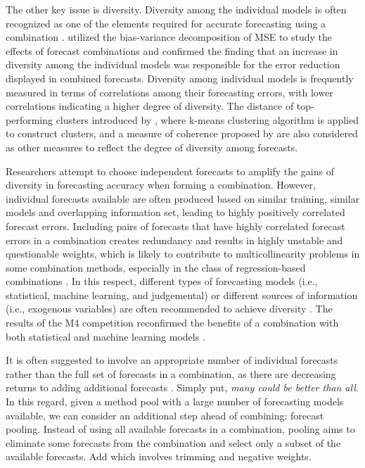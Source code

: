 \documentclass[11pt]{article}
\begin{document}
The other key issue is diversity. Diversity among the individual models is often recognized as one of the elements required for accurate forecasting using a combination \citep{Batchelor1995-ps,Brown2005-aa,Thomson2019-al}. \cite{Atiya2020-ge} utilized the bias-variance decomposition of MSE to study the effects of forecast combinations and confirmed the finding that an increase in diversity among the individual models was responsible for the error reduction displayed in combined forecasts. Diversity among individual models is frequently measured in terms of correlations among their forecasting errors, with lower correlations indicating a higher degree of diversity. The distance of top-performing clusters introduced by \cite{Lemke2010-wn}, where k-means clustering algorithm is applied to construct clusters, and a measure of coherence proposed by \cite{Thomson2019-al} are also considered as other measures to reflect the degree of diversity among forecasts.

Researchers attempt to choose independent forecasts to amplify the gains of diversity in forecasting accuracy when forming a combination. However, individual forecasts available are often produced based on similar training, similar models and overlapping information set, leading to highly positively correlated forecast errors. Including pairs of forecasts that have highly correlated forecast errors in a combination creates redundancy and results in highly unstable and questionable weights, which is likely to contribute to multicollinearity problems in some combination methods, especially in the class of regression-based combinations \citep{Granger1984-jc}. In this respect, different types of forecasting models (i.e., statistical, machine learning, and judgemental) or different sources of information (i.e., exogenous variables) are often recommended to achieve diversity \citep{Atiya2020-ge}. The results of the M4 competition reconfirmed the benefits of a combination with both statistical and machine learning models \citep{Makridakis2020-hu}.

It is often suggested to involve an appropriate number of individual forecasts rather than the full set of forecasts in a combination, as there are decreasing returns to adding additional forecasts \citep{Armstrong2001-sj,Zhou2002-cg,Geweke2011-xk,Lichtendahl2020-ut}. Simply put, \textit{many could be better than all}. In this regard, given a method pool with a large number of forecasting models available, we can consider an additional step ahead of combining: forecast pooling. Instead of using all available forecasts in a combination, pooling aims to eliminate some forecasts from the combination and select only a subset of the available forecasts. {\color{red} Add \cite{Radchenko2021-cw} which involves trimming and negative weights.}
\end{document}
